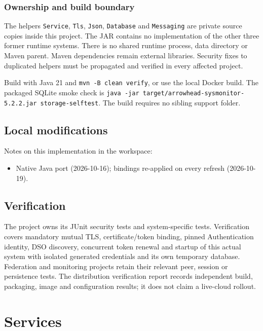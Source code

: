 \documentclass[a4paper]{arrowhead}
\begin{document}
\subsubsection{Ownership and build boundary}
The helpers \texttt{Service}, \texttt{Tls}, \texttt{Json}, \texttt{Database} and \texttt{Messaging} are private source copies inside this project. The JAR contains no implementation of the other three former runtime systems. There is no shared runtime process, data directory or Maven parent. Maven dependencies remain external libraries. Security fixes to duplicated helpers must be propagated and verified in every affected project.

Build with Java 21 and \texttt{mvn -\allowbreak{}B clean verify}, or use the local Docker build. The packaged SQLite smoke check is \texttt{java -\allowbreak{}jar target/\allowbreak{}arrowhead-\allowbreak{}sysmonitor-\allowbreak{}5.2.2.jar storage-\allowbreak{}selftest}. The build requires no sibling support folder.

\subsection{Local modifications}
\label{sec:local}

Notes on this implementation in the workspace:
\begin{itemize}
  \item Native Java port (2026-10-16); bindings re-applied on every refresh (2026-10-19).
\end{itemize}

\subsection{Verification}

The project owns its JUnit security tests and system-specific tests. Verification covers mandatory mutual TLS, certificate/token binding, pinned Authentication identity, DSO discovery, concurrent token renewal and startup of this actual system with isolated generated credentials and its own temporary database. Federation and monitoring projects retain their relevant peer, session or persistence tests. The distribution verification report records independent build, packaging, image and configuration results; it does not claim a live-cloud rollout.

\newpage

\section{Services}
\label{sec:services}
\end{document}
